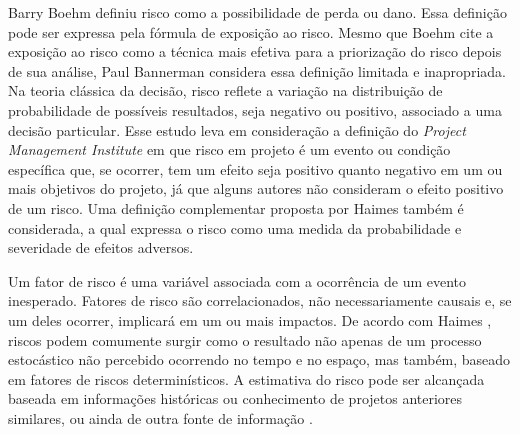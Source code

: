 Barry Boehm \cite{BOEHM1991} definiu risco como a possibilidade de perda ou dano. Essa definição pode ser expressa pela fórmula de exposição ao risco. Mesmo que Boehm cite a exposição ao risco como a técnica mais efetiva para a priorização do risco depois de sua análise, Paul Bannerman \cite{bannerman2008risk} considera essa definição limitada e inapropriada. Na teoria clássica da decisão, risco reflete a variação na distribuição de probabilidade de possíveis resultados, seja negativo ou positivo, associado a uma decisão particular. Esse estudo leva em consideração a definição do \textit{Project Management Institute} \cite{PMBOK2008} em que risco em projeto é um evento ou condição específica que, se ocorrer, tem um efeito seja positivo quanto negativo em um ou mais objetivos do projeto, já que alguns autores não consideram o efeito positivo de um risco. Uma definição complementar proposta por Haimes \cite{haimes2011risk} também é considerada, a qual expressa o risco como uma medida da probabilidade e severidade de efeitos adversos.

Um fator de risco é uma variável associada com a ocorrência de um evento inesperado. Fatores de risco são correlacionados, não necessariamente causais e, se um deles ocorrer, implicará em um ou mais impactos. De acordo com Haimes \cite{haimes2011risk}, riscos podem comumente surgir como o resultado não apenas de um processo estocástico não percebido ocorrendo no tempo e no espaço, mas também, baseado em fatores de riscos determinísticos. A estimativa do risco pode ser alcançada baseada em informações históricas ou conhecimento de projetos anteriores similares, ou ainda de outra fonte de informação \cite{PMBOK2008}.

